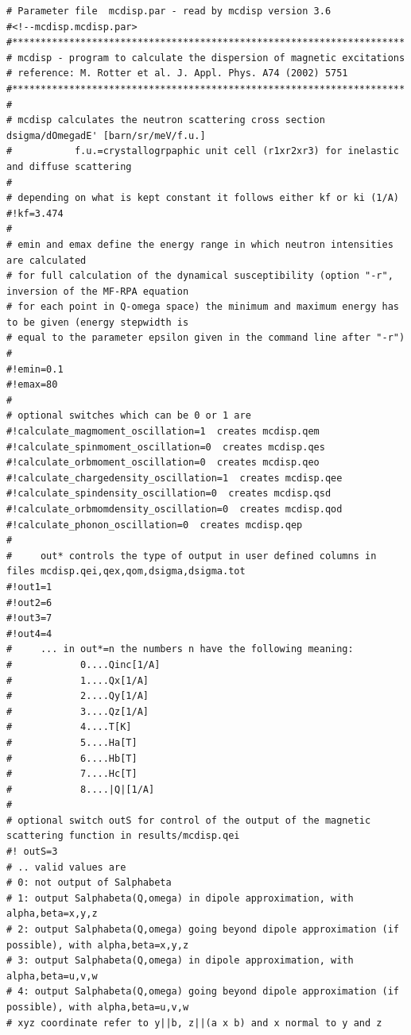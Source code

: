 {\footnotesize
\begin{verbatim}
# Parameter file  mcdisp.par - read by mcdisp version 3.6
#<!--mcdisp.mcdisp.par>
#*********************************************************************
# mcdisp - program to calculate the dispersion of magnetic excitations
# reference: M. Rotter et al. J. Appl. Phys. A74 (2002) 5751
#*********************************************************************
#
# mcdisp calculates the neutron scattering cross section dsigma/dOmegadE' [barn/sr/meV/f.u.]
#           f.u.=crystallogrpaphic unit cell (r1xr2xr3) for inelastic and diffuse scattering
#
# depending on what is kept constant it follows either kf or ki (1/A)
#!kf=3.474
# 
# emin and emax define the energy range in which neutron intensities are calculated
# for full calculation of the dynamical susceptibility (option "-r", inversion of the MF-RPA equation 
# for each point in Q-omega space) the minimum and maximum energy has to be given (energy stepwidth is 
# equal to the parameter epsilon given in the command line after "-r")
#
#!emin=0.1
#!emax=80
#
# optional switches which can be 0 or 1 are
#!calculate_magmoment_oscillation=1  creates mcdisp.qem
#!calculate_spinmoment_oscillation=0  creates mcdisp.qes
#!calculate_orbmoment_oscillation=0  creates mcdisp.qeo
#!calculate_chargedensity_oscillation=1  creates mcdisp.qee
#!calculate_spindensity_oscillation=0  creates mcdisp.qsd
#!calculate_orbmomdensity_oscillation=0  creates mcdisp.qod
#!calculate_phonon_oscillation=0  creates mcdisp.qep
#
#     out* controls the type of output in user defined columns in files mcdisp.qei,qex,qom,dsigma,dsigma.tot
#!out1=1 
#!out2=6 
#!out3=7 
#!out4=4 
#     ... in out*=n the numbers n have the following meaning:
#            0....Qinc[1/A] 
#            1....Qx[1/A]   
#            2....Qy[1/A]   
#            3....Qz[1/A]   
#            4....T[K]      
#            5....Ha[T]     
#            6....Hb[T]     
#            7....Hc[T]     
#            8....|Q|[1/A]  
#
# optional switch outS for control of the output of the magnetic scattering function in results/mcdisp.qei
#! outS=3
# .. valid values are
# 0: not output of Salphabeta
# 1: output Salphabeta(Q,omega) in dipole approximation, with alpha,beta=x,y,z
# 2: output Salphabeta(Q,omega) going beyond dipole approximation (if possible), with alpha,beta=x,y,z
# 3: output Salphabeta(Q,omega) in dipole approximation, with alpha,beta=u,v,w
# 4: output Salphabeta(Q,omega) going beyond dipole approximation (if possible), with alpha,beta=u,v,w
# xyz coordinate refer to y||b, z||(a x b) and x normal to y and z

\end{verbatim}}
